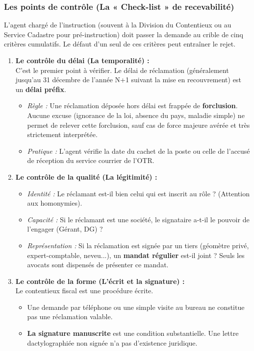 \documentclass[Cours_contentieuxTF2026.tex]{subfiles}
\begin{document}
\subsubsection{Les points de contrôle (La « Check-list » de recevabilité)}

L'agent chargé de l'instruction (souvent à la Division du Contentieux ou au Service Cadastre pour pré-instruction) doit passer la demande au crible de cinq critères cumulatifs. Le défaut d'un seul de ces critères peut entraîner le rejet.

\begin{enumerate}
	\item \textbf{Le contrôle du délai (La temporalité) :} \\
	C'est le premier point à vérifier. Le délai de réclamation (généralement jusqu'au 31 décembre de l'année N+1 suivant la mise en recouvrement) est un \textbf{délai préfix}.
	\begin{itemize}
		\item \textit{Règle :} Une réclamation déposée hors délai est frappée de \textbf{forclusion}. Aucune excuse (ignorance de la loi, absence du pays, maladie simple) ne permet de relever cette forclusion, sauf cas de force majeure avérée et très strictement interprétée.
		\item \textit{Pratique :} L'agent vérifie la date du cachet de la poste ou celle de l'accusé de réception du service courrier de l'OTR.
	\end{itemize}
	
	\item \textbf{Le contrôle de la qualité (La légitimité) :}
	\begin{itemize}
		\item \textit{Identité :} Le réclamant est-il bien celui qui est inscrit au rôle ? (Attention aux homonymies).
		\item \textit{Capacité :} Si le réclamant est une société, le signataire a-t-il le pouvoir de l'engager (Gérant, DG) ?
		\item \textit{Représentation :} Si la réclamation est signée par un tiers (géomètre privé, expert-comptable, neveu...), un \textbf{mandat régulier} est-il joint ? Seuls les avocats sont dispensés de présenter ce mandat.
	\end{itemize}
	
	\item \textbf{Le contrôle de la forme (L'écrit et la signature) :} \\
	Le contentieux fiscal est une procédure écrite.
	\begin{itemize}
		\item Une demande par téléphone ou une simple visite au bureau ne constitue pas une réclamation valable.
		\item \textbf{La signature manuscrite} est une condition substantielle. Une lettre dactylographiée non signée n'a pas d'existence juridique.
	\end{itemize}
	

\end{enumerate}
\end{document}

